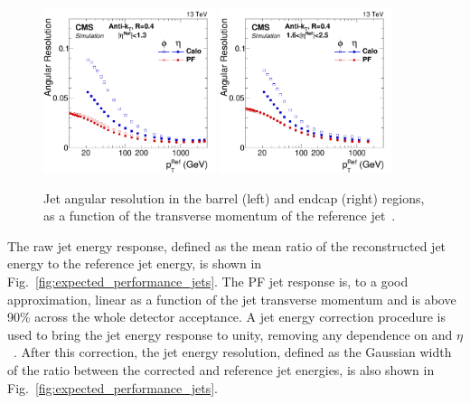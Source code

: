 \begin{figure}[htb]\centering 
\includegraphics[width=0.45\textwidth]{figs/cms/EtaPhiResVsRefPt_Barrel_AK4CaloL2L3_AK4PFL2L3_RMS_no2000.pdf} 
\includegraphics[width=0.45\textwidth]{figs/cms/EtaPhiResVsRefPt_Endcap_AK4CaloL2L3_AK4PFL2L3_RMS_no2000.pdf}
\caption{Jet angular resolution in the barrel (left) and endcap (right) regions, as a function of the transverse momentum of the reference jet~\cite{Khachatryan:2016kdb}.\label{fig:expected_performance_jets_angular}}
\end{figure}



The raw jet energy response, defined as the mean ratio of the
reconstructed jet energy to the reference jet energy, is shown in
Fig.~\ref{fig:expected_performance_jets}. The PF jet response is, to a
good approximation, linear as a function of the jet transverse momentum and is above 90\%
across the whole detector acceptance. A jet energy correction procedure is used to bring the jet energy
response to unity, removing any dependence on \pt and
$\eta$~\cite{Khachatryan:2016kdb}. After this correction, the jet
energy resolution, defined as the Gaussian width of the ratio between
the corrected and reference jet energies, is also shown in Fig.~\ref{fig:expected_performance_jets}.

